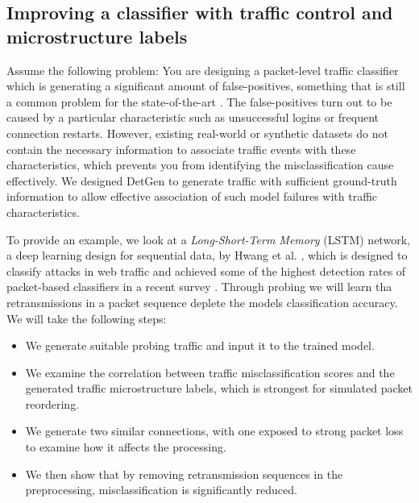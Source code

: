 \documentclass[runningheads]{llncs}
\begin{document}
\subsection{Improving a classifier with traffic control and microstructure labels}
\label{Sec:Improvedtrafficsep}


Assume the following problem: You are designing a packet-level traffic classifier which is generating a significant amount of false-positives, something that is still a common problem for the state-of-the-art \cite{nisioti2018intrusion}. The false-positives turn out to be caused by a particular characteristic such as unsuccessful logins or frequent connection restarts. However, existing real-world or synthetic datasets do not contain the necessary information to associate traffic events with these characteristics, which prevents you from identifying the misclassification cause effectively. We designed DetGen to generate traffic with sufficient ground-truth information to allow effective association of such model failures with traffic characteristics.

To provide an example, we look at a \textit{Long-Short-Term Memory} (LSTM) network, a deep learning design for sequential data, by Hwang et al. \cite{hwang2019lstm}, which is designed to classify attacks in web traffic and achieved some of the highest detection rates of packet-based classifiers in a recent survey \cite{tahaei2020rise}. Through probing we will learn tha retransmissions in a packet sequence deplete the models classification accuracy. We will take the following steps:

\begin{itemize}
\item We generate suitable probing traffic and input it to the trained model.
\item We examine the correlation between traffic misclassification scores and the generated traffic microstructure labels, which is strongest for simulated packet reordering.
\item We generate two similar connections, with one exposed to strong packet loss to examine how it affects the processing.
\item We then show that by removing retransmission sequences in the preprocessing, misclassification is significantly reduced.
\end{itemize}

\end{document}
